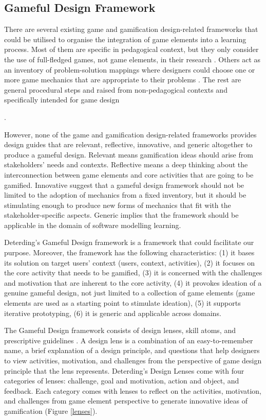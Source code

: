 \documentclass[12pt, a4paper]{report}
\begin{document}
\subsection{Gameful Design Framework}
There are several existing game and gamification design-related frameworks that could be utilised to organise the integration of game elements into a learning process. Most of them are specific in pedagogical context, but they only consider the use of full-fledged games, not game elements, in their research \cite{garris2002games, yusoff2009conceptual, de2011serious}. Others act as an inventory of problem-solution mappings where designers could choose one or more game mechanics that are appropriate to their problems \cite{arnab2015mapping, chou2013octalysis}. The rest are general procedural steps and raised from non-pedagogical contexts \cite{werbach2012win, kumar2013framework, huang2013gamification} and specifically intended for game design {\cite{hunicke2004mda}. 

However, none of the game and gamification design-related frameworks provides design guides that are relevant, reflective, innovative, and generic altogether to produce a gameful design. Relevant means gamification ideas should arise from stakeholders' needs and contexts. Reflective means a deep thinking about the interconnection between game elements and core activities that are going to be gamified. Innovative suggest that a gameful design framework should not be limited to the adoption of mechanics from a fixed inventory, but it should be stimulating enough to produce new forms of mechanics that fit with the stakeholder-specific aspects. Generic implies that the framework should be applicable in the domain of software modelling learning.

Deterding's Gameful Design framework \cite{deterding2015lens} is a framework that could facilitate our purpose.  Moreover, the framework has the following characteristics: (1) it bases its solution on target users' context (users, context, activities), (2) it focuses on the core activity that needs to be gamified, (3) it is concerned with the challenges and motivation that are inherent to the core activity, (4) it provokes ideation of a genuine gameful design, not just limited to a collection of game elements (game elements are used as a starting point to stimulate ideation), (5) it supports iterative prototyping, (6) it is generic and applicable across domains.               

The Gameful Design framework consists of design lenses, skill atoms, and prescriptive guidelines \cite{deterding2015lens}. A design lens is a combination of an easy-to-remember name, a brief explanation of a design principle, and questions that help designers to view activities, motivation, and challenges from the perspective of game design principle that the lens represents. Deterding's Design Lenses \cite{deterding2015lens} come with four categories of lenses: challenge, goal and motivation, action and object, and feedback. Each category comes with lenses to reflect on the activities, motivation, and challenges from game element perspective to generate innovative ideas of gamification (Figure \ref{lenses}). 

}
\end{document}
